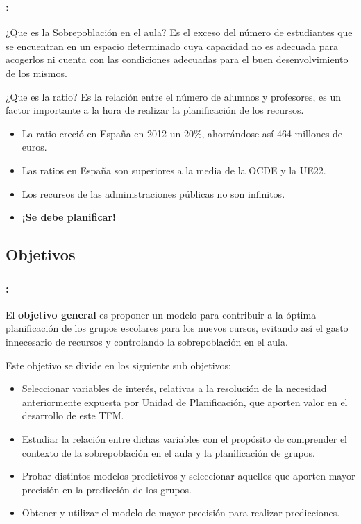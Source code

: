 \documentclass{beamer}
\begin{document}
\begin{frame}[allowframebreaks=1]
\frametitle{\secname : \subsecname}
\begin{block}{¿Que es la Sobrepoblación en el aula?}  %
Es el exceso del número de estudiantes que se encuentran en un espacio determinado cuya capacidad no es adecuada para acogerlos ni cuenta con las condiciones adecuadas para el buen desenvolvimiento de los mismos. \cite{LILIA2013}
\end{block}

\begin{block}{¿Que es la ratio?}  %
Es la relación entre el número de alumnos y profesores, es un factor importante a la hora de realizar la planificación de los recursos.
\end{block} %
\framebreak
\begin{itemize}
	\item La ratio creció en España en 2012 un 20\%, ahorrándose así 464 millones de euros.
	\item Las ratios en España son superiores a la media de la OCDE y la UE22. \cite{PANORAMA2018}
	\item Los recursos de las administraciones públicas no son infinitos.
	\item \textbf{¡Se debe planificar!}
	
	
\end{itemize}
	
\end{frame}

\subsection{Objetivos}
\begin{frame}[allowframebreaks=1]
\frametitle{\secname : \subsecname}

El \textbf{objetivo general} es proponer un modelo para contribuir a la óptima planificación de los grupos escolares para los nuevos cursos, evitando así el gasto innecesario de recursos y controlando la sobrepoblación en el aula. \newline

Este objetivo se divide en los siguiente sub objetivos:

\begin{itemize}
	\item Seleccionar variables de interés, relativas a la resolución de la necesidad anteriormente expuesta por Unidad de Planificación, que aporten valor en el desarrollo de este TFM. 
	\framebreak
	\item Estudiar la relación entre dichas variables con el propósito de comprender el contexto de la sobrepoblación en el aula y la planificación de grupos.
	\item Probar distintos modelos predictivos y seleccionar aquellos que aporten mayor precisión en la predicción de los grupos. 
	\item Obtener y utilizar el modelo de mayor precisión para realizar predicciones.
	
\end{itemize}
	
\end{frame}
\end{document}
